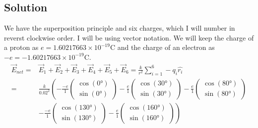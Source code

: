 \documentclass[12pt]{article}
\begin{document}
\subsection*{Solution}
We have the superposition principle and six charges, which I will number in reverst clockwise order. I will be using vector notation. We will keep the charge of a proton as $e = 1.60217663 \times 10^{-19} \unit{\coulomb}$ and the charge of an electron as $-e = -1.60217663 \times 10^{-19} \unit{\coulomb}$.
\begin{align*}
    \vec{E}_{net}   =&  \vec{E}_1 + \vec{E}_2 + \vec{E}_3 + \vec{E}_4 + \vec{E}_5 + \vec{E}_6
        =   \frac{k}{r^2}\sum_{i=1}^{6} - q_i \hat{r_i}\\
        =&  \frac{k}{0.02^2}\left(-\frac{-e}{1}\begin{pmatrix}\cos(0\unit{\degree})\\ \sin(0\unit{\degree})\end{pmatrix}
            - \frac{e}{1}\begin{pmatrix}\cos(30\unit{\degree})\\ \sin(30\unit{\degree})\end{pmatrix}
            - \frac{e}{1}\begin{pmatrix}\cos(80\unit{\degree})\\ \sin(80\unit{\degree})\end{pmatrix}\right. \\
            & \left. - \frac{-e}{1}\begin{pmatrix}\cos(130\unit{\degree})\\ \sin(130\unit{\degree})\end{pmatrix}
            - \frac{e}{1}\begin{pmatrix}\cos(160\unit{\degree})\\ \sin(160\unit{\degree})\end{pmatrix}\right)
\end{align*}
\end{document}
